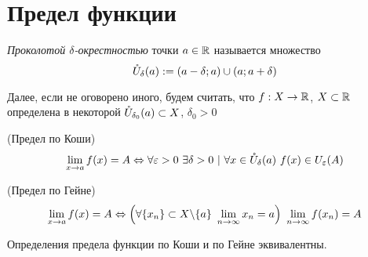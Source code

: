\section{Предел функции}

\begin{definition}
	\textit{Проколотой $\delta$-окрестностью} точки $a \in \mathbb{R}$ называется множество
	$$
		\mathring{U}_{\delta}(a) := (a - \delta; a) \cup (a; a + \delta)
	$$
\end{definition}

\begin{note}
	Далее, если не оговорено иного, будем считать, что $f : X \rightarrow \mathbb{R}$, $X \subset \mathbb{R}$ определена в некоторой $\mathring{U}_{\delta_0}(a) \subset X$, $\delta_0 > 0$
\end{note}

\begin{definition} (Предел по Коши)
	$$
		\lim\limits_{x \to a} f(x) = A \Leftrightarrow \forall \varepsilon > 0\ \exists \delta > 0\ |\ \forall x \in \mathring{U}_{\delta}(a)\ f(x) \in U_{\varepsilon}(A)
	$$
\end{definition}

\begin{definition} (Предел по Гейне)
	$$
		\lim\limits_{x \to a} f(x) = A \Leftrightarrow \left(\forall \{x_n\} \subset X \backslash \{a\}\ \lim\limits_{n \to \infty} x_n = a\right)\ \lim\limits_{n \to \infty} f(x_n) = A
	$$
\end{definition}

\begin{theorem}
	Определения предела функции по Коши и по Гейне эквивалентны.
\end{theorem}

